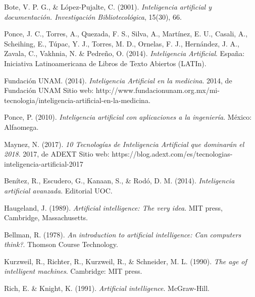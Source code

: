 

\begin{thebibliography}{x}

 Bote, V. P. G., \& López-Pujalte, C. (2001). \textit{Inteligencia artificial y documentación. Investigación Bibliotecológica}, 15(30), 66.

 Ponce, J. C., Torres, A., Quezada, F. S., Silva, A., Martínez, E. U., Casali, A., Scheihing, E., Túpac, Y. J., Torres, M. D., Ornelas, F. J., Hernández, J. A., Zavala, C., Vakhnia, N. \& Pedreño, O. (2014). \textit{Inteligencia Artificial}. España: Iniciativa Latinoamericana de Libros de Texto Abiertos (LATIn).

 Fundación UNAM. (2014). \textit{Inteligencia Artificial en la medicina}. 2014, de Fundación UNAM Sitio web: http://www.fundacionunam.org.mx/mi-tecnologia/inteligencia-artificial-en-la-medicina.

 Ponce, P. (2010). \textit{Inteligencia artificial con aplicaciones a la ingeniería}. México: Alfaomega.

 Maynez, N. (2017). \textit{10 Tecnologías de Inteligencia Artificial que dominarán el 2018}. 2017, de ADEXT Sitio web: https://blog.adext.com/es/tecnologias-inteligencia-artificial-2017

 Benítez, R., Escudero, G., Kanaan, S., \& Rodó, D. M. (2014). \textit{Inteligencia artificial avanzada}. Editorial UOC.

 Haugeland, J. (1989). \textit{Artificial intelligence: The very idea}. MIT press, Cambridge, Massachusetts.

 Bellman, R. (1978). \textit{An introduction to artificial intelligence: Can computers think?}. Thomson Course Technology.

 Kurzweil, R., Richter, R., Kurzweil, R., \& Schneider, M. L. (1990). \textit{The age of intelligent machines}. Cambridge: MIT press.

 Rich, E. \& Knight, K. (1991). \textit{Artificial intelligence}. McGraw-Hill.


\end{thebibliography}
